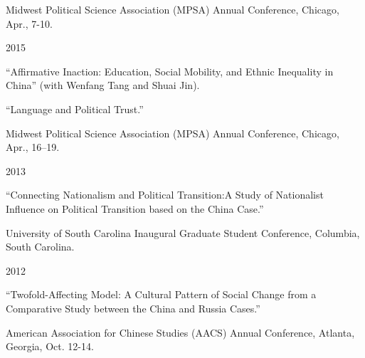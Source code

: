\documentclass[10.5pt,]{article}
\providecommand{\tightlist}{%
	\setlength{\itemsep}{0pt}\setlength{\parskip}{0pt}}
\renewenvironment{itemize}{
	\begin{list}{}{
			\setlength{\leftmargin}{1.5em}
		}
	}{
	\end{list}
}
\begin{document}
\begin{itemize}
\begin{itemize}
    \begin{itemize}
    \tightlist
    \item
      \footnotesize Midwest Political Science Association (MPSA) Annual
      Conference, Chicago, Apr., 7-10.
    \end{itemize}
  \end{itemize}
\item
  2015

  \begin{itemize}
  \tightlist
  \item
    ``Affirmative Inaction: Education, Social Mobility, and Ethnic
    Inequality in China'' (with Wenfang Tang and Shuai Jin).
  \item
    ``Language and Political Trust.''

    \begin{itemize}
    \tightlist
    \item
      \footnotesize Midwest Political Science Association (MPSA) Annual
      Conference, Chicago, Apr., 16--19.
    \end{itemize}
  \end{itemize}
\item
  2013

  \begin{itemize}
  \tightlist
  \item
    ``Connecting Nationalism and Political Transition:A Study of
    Nationalist Influence on Political Transition based on the China
    Case.''

    \begin{itemize}
    \tightlist
    \item
      \footnotesize University of South Carolina Inaugural Graduate
      Student Conference, Columbia, South Carolina.
    \end{itemize}
  \end{itemize}
\item
  2012

  \begin{itemize}
  \tightlist
  \item
    ``Twofold-Affecting Model: A Cultural Pattern of Social Change from
    a Comparative Study between the China and Russia Cases.''

    \begin{itemize}
    \tightlist
    \item
      \footnotesize American Association for Chinese Studies (AACS)
      Annual Conference, Atlanta, Georgia, Oct. 12-14.
    \end{itemize}
  \end{itemize}
\end{itemize}
\end{document}
